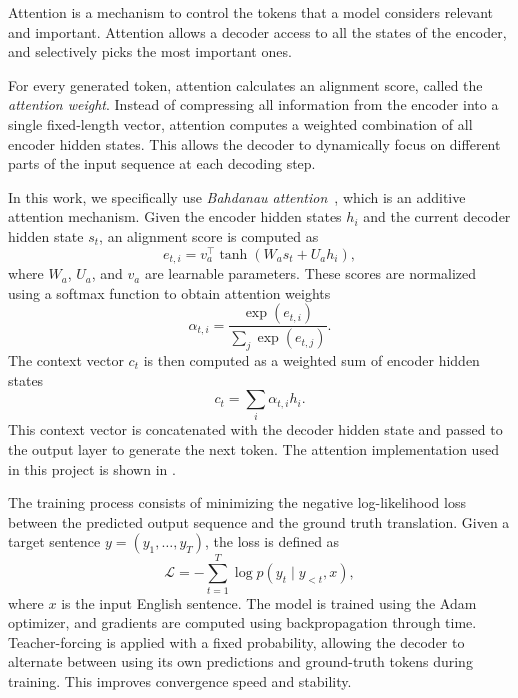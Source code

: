 Attention is a mechanism to control the tokens 
that a model considers relevant and important. 
Attention allows a decoder access to all the states
of the encoder, and selectively picks the most important ones.

For every generated token, attention calculates an alignment
score, called the \emph{attention weight}.
Instead of compressing all information from the encoder into
a single fixed-length vector, attention computes a weighted
combination of all encoder hidden states.
This allows the decoder to dynamically focus on different
parts of the input sequence at each decoding step.

In this work, we specifically use \emph{Bahdanau attention}~\cite{bahdanauEndtoendAttentionbasedLarge2016},
which is an additive attention mechanism.
Given the encoder hidden states $h_i$ and the current decoder
hidden state $s_t$, an alignment score is computed as
\begin{equation}
e_{t,i} = v_a^\top \tanh(W_a s_t + U_a h_i),
\end{equation}
where $W_a$, $U_a$, and $v_a$ are learnable parameters.
These scores are normalized using a softmax function to obtain
attention weights
\begin{equation}
\alpha_{t,i} = \frac{\exp(e_{t,i})}{\sum_j \exp(e_{t,j})}.
\end{equation}
The context vector $c_t$ is then computed as a weighted sum
of encoder hidden states
\begin{equation}
c_t = \sum_i \alpha_{t,i} h_i.
\end{equation}
This context vector is concatenated with the decoder hidden
state and passed to the output layer to generate the next token.
The attention implementation used in this project is shown in
.


The training process consists of minimizing the negative
log-likelihood loss between the predicted output sequence
and the ground truth translation.
Given a target sentence $y = (y_1, \dots, y_T)$, the loss is defined as
\begin{equation}
\mathcal{L} = -\sum_{t=1}^{T} \log p(y_t \mid y_{<t}, x),
\end{equation}
where $x$ is the input English sentence.
The model is trained using the Adam optimizer, and gradients
are computed using backpropagation through time.
Teacher-forcing is applied with a fixed probability, allowing
the decoder to alternate between using its own predictions
and ground-truth tokens during training.
This improves convergence speed and stability.


